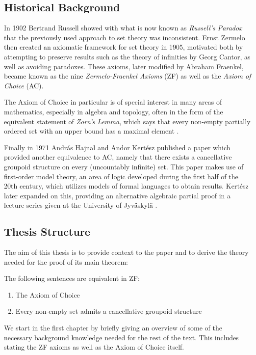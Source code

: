\documentclass[../../main.tex]{subfiles}
\begin{document}
\subsection*{Historical Background}

In 1902 Bertrand Russell showed with what is now known as \textit{Russell's Paradox} that the previously used approach to set theory was inconsistent.
Ernst Zermelo then created an axiomatic framework for set theory in 1905, motivated both by attempting to preserve results such as the theory of infinities by Georg Cantor, as well as avoiding paradoxes.
These axioms, later modified by Abraham Fraenkel, became known as the nine \textit{Zermelo-Fraenkel Axioms} (ZF) as well as the \textit{Axiom of Choice} (AC)\cite[pp.66-70, 75]{Gol17}.

The Axiom of Choice in particular is of special interest in many areas of mathematics, especially in algebra and topology, often in the form of the equivalent statement of \textit{Zorn's Lemma},
which says that every non-empty partially ordered set with an upper bound has a maximal element \cite{Jec78}.

Finally in 1971 András Hajnal and Andor Kertész published a paper \cite{Haj72} which provided another equivalence to AC, namely that there exists a cancellative groupoid structure on every (uncountably infinite) set.
This paper makes use of first-order model theory, an area of logic developed during the first half of the 20th century, which utilizes models of formal languages to obtain results.
Kertész later expanded on this, providing an alternative algebraic partial proof in a lecture series given at the University of Jyväskylä \cite{Ker75}.

\subsection*{Thesis Structure}

The aim of this thesis is to provide context to the paper \cite{Haj72} and to derive the theory needed for the proof of its main theorem:
\begin{utheorem}
    The following sentences are equivalent in ZF:
    \begin{enumerate}
        \item The Axiom of Choice
        \item Every non-empty set admits a cancellative groupoid structure
    \end{enumerate}
\end{utheorem}
We start in the first chapter by briefly giving an overview of some of the necessary background knowledge needed for the rest of the text.
This includes stating the ZF axioms as well as the Axiom of Choice itself.
\end{document}
